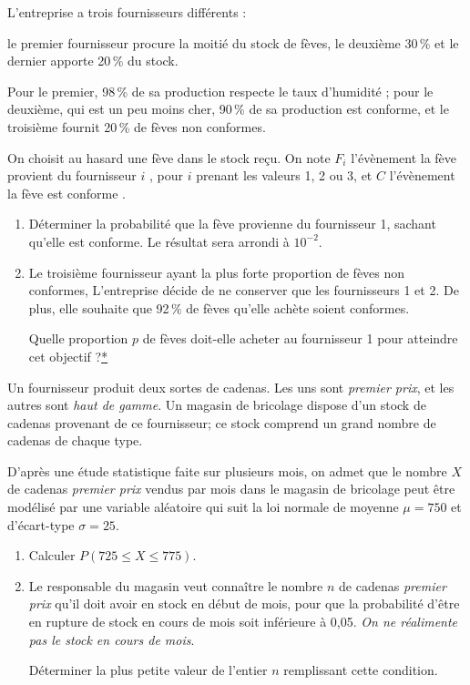 \documentclass[12pt,french]{article}
\begin{document}
\begin{question}[subtitle={Amérique du Nord 2015}]
L'entreprise a trois fournisseurs différents : 

le premier fournisseur procure la moitié du stock de fèves, le deuxième 30\,\% et le dernier apporte 20\,\% du stock. 

Pour le premier, 98\,\% de sa production respecte le taux d'humidité ; pour le deuxième, qui est un peu moins cher, 90\,\% de sa production est conforme, et le troisième fournit 20\,\% de fèves non conformes. 

On choisit au hasard une fève dans le stock reçu. On note $F_i$ l'évènement \og la fève provient du fournisseur $i$ \fg, pour $i$ prenant les valeurs 1, 2 ou 3, et $C$ l'évènement \og la fève est conforme \fg. 

\medskip

\begin{enumerate}
\item Déterminer la probabilité que la fève provienne du fournisseur 1, sachant qu'elle est conforme. Le résultat sera arrondi à $10^{-2}$. 
\item Le troisième fournisseur ayant la plus forte proportion de fèves non conformes, L’entreprise décide de ne conserver que les fournisseurs 1 et 2. De plus, elle souhaite que 92\,\% de fèves qu'elle achète soient conformes. 

Quelle proportion $p$ de fèves doit-elle acheter au fournisseur 1 pour atteindre cet objectif ?\hyperlink{Index}{*} 
\end{enumerate}

\end{question}

\begin{question}[subtitle={Centres étrangers 2015}]
Un fournisseur produit deux sortes de cadenas. Les uns sont \emph{premier prix}, et les autres sont \emph{haut de gamme}. Un magasin de bricolage dispose d'un stock de cadenas provenant de ce fournisseur; ce
stock comprend un grand nombre de cadenas de chaque type.

D'après une étude statistique faite sur plusieurs mois, on admet que le nombre $X$ de cadenas
\emph{premier prix} vendus par mois dans le magasin de bricolage peut être modélisé par une variable aléatoire qui suit la loi normale de moyenne $\mu = 750$ et d'écart-type $\sigma = 25$.

\medskip

\begin{enumerate}
\item Calculer $P(725 \leqslant  X \leqslant 775)$.
\item Le responsable du magasin veut connaître le nombre $n$ de cadenas \emph{premier prix} qu'il doit avoir en stock en début de mois, pour que la probabilité d'être en rupture de stock en cours de mois soit inférieure à 0,05. \emph{On ne réalimente pas le stock en cours de mois}.

\medskip

Déterminer la plus petite valeur de l'entier $n$ remplissant cette condition.
\end{enumerate}

\end{question}
\end{document}
